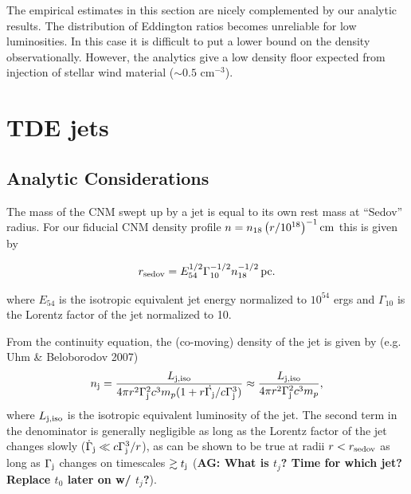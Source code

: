 \documentclass[usenatbib,fleqn]{mnras}
\begin{document}
The empirical estimates in this section are nicely complemented by our
analytic results. The distribution of Eddington ratios becomes
unreliable for low luminosities.  In this case it is difficult to put
a lower bound on the density observationally. However, the analytics
give a low density floor expected from injection of stellar wind
material ($\sim 0.5$ cm$^{-3}$).




\section{TDE jets}
\label{sec:jet}

\subsection{Analytic Considerations}
\label{sec:analytic}

The mass of the CNM swept up by a jet is equal to its own rest mass at
``Sedov'' radius. For our fiducial CNM density profile $n=n_{18}
\left(r/10^{18}\right)^{-1} {\rm cm}$ this is given by


\begin{equation}
r_{\rm sedov} = E_{54}^{1/2} \Gamma_{10}^{-1/2} n_{\rm 18}^{-1/2}\,{\rm pc}. 
\end{equation}

\noindent where $E_{54}$ is the isotropic equivalent jet energy
normalized to $10^{54}$ ergs and $\Gamma_{10}$ is the Lorentz factor
of the jet normalized to 10.

From the continuity equation, the (co-moving) density of the jet is
given by (e.g. Uhm \& Beloborodov 2007)
 \begin{align}
   n_{\rm j} =  \frac{L_{\rm j, iso}}{4 \pi r^{2}\Gamma_{\rm
       j}^{2}c^{3}m_p(1 + r \dot{\Gamma_{\rm j}}/c\Gamma_{\rm j}^{3})}
   \approx  \frac{L_{\rm j, iso}}{4 \pi r^{2}\Gamma_{\rm j}^{2}c^{3}m_p},
\end{align}
%
where $L_{\rm j, iso}$ is the isotropic equivalent luminosity of the
jet. The second term in the denominator is generally negligible as
long as the Lorentz factor of the jet changes slowly
($\dot{\Gamma}_{\rm j} \ll c\Gamma_{\rm j}^{3}/r$), as can be shown to
be true at radii $r < r_{\rm sedov}$ as long as $\Gamma_{\rm j}$
changes on timescales $\gtrsim t_{\rm j}$ ({\bf AG: What is $t_j$?
  Time for which jet? Replace $t_0$ later on w/ $t_j$?}).
\end{document}
